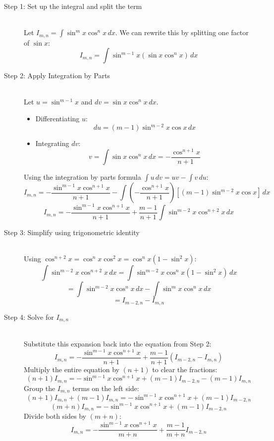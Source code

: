\documentclass[11pt, a4paper]{article}
\begin{document}
\begin{description}
    \item[Step 1: Set up the integral and split the term] \ \\
    Let $I_{m, n} = \int \sin^m x \cos^n x \, dx$.
    We can rewrite this by splitting one factor of $\sin x$:
    \[ I_{m, n} = \int \sin^{m-1} x \left( \sin x \cos^n x \right) \, dx \]

    \item[Step 2: Apply Integration by Parts] \ \\
    Let $u = \sin^{m-1} x$ and $dv = \sin x \cos^n x \, dx$.
    \begin{itemize}
        \item Differentiating $u$:
        \[ du = (m-1) \sin^{m-2} x \cos x \, dx \]
        \item Integrating $dv$:
        \[ v = \int \sin x \cos^n x \, dx = -\frac{\cos^{n+1} x}{n+1} \]
    \end{itemize}
    Using the integration by parts formula $\int u \, dv = uv - \int v \, du$:
    \[ I_{m, n} = -\frac{\sin^{m-1} x \cos^{n+1} x}{n+1} - \int \left( -\frac{\cos^{n+1} x}{n+1} \right) \left[ (m-1) \sin^{m-2} x \cos x \right] \, dx \]
    \[ I_{m, n} = -\frac{\sin^{m-1} x \cos^{n+1} x}{n+1} + \frac{m-1}{n+1} \int \sin^{m-2} x \cos^{n+2} x \, dx \]

    \item[Step 3: Simplify using trigonometric identity] \ \\
    Using $\cos^{n+2} x = \cos^n x \cos^2 x = \cos^n x (1 - \sin^2 x)$:
    \[ \int \sin^{m-2} x \cos^{n+2} x \, dx = \int \sin^{m-2} x \cos^n x (1 - \sin^2 x) \, dx \]
    \[ = \int \sin^{m-2} x \cos^n x \, dx - \int \sin^m x \cos^n x \, dx \]
    \[ = I_{m-2, n} - I_{m, n} \]

    \item[Step 4: Solve for $I_{m, n}$] \ \\
    Substitute this expansion back into the equation from Step 2:
    \[ I_{m, n} = -\frac{\sin^{m-1} x \cos^{n+1} x}{n+1} + \frac{m-1}{n+1} \left( I_{m-2, n} - I_{m, n} \right) \]
    Multiply the entire equation by $(n+1)$ to clear the fractions:
    \[ (n+1) I_{m, n} = -\sin^{m-1} x \cos^{n+1} x + (m-1) I_{m-2, n} - (m-1) I_{m, n} \]
    Group the $I_{m, n}$ terms on the left side:
    \[ (n+1) I_{m, n} + (m-1) I_{m, n} = -\sin^{m-1} x \cos^{n+1} x + (m-1) I_{m-2, n} \]
    \[ (m+n) I_{m, n} = -\sin^{m-1} x \cos^{n+1} x + (m-1) I_{m-2, n} \]
    Divide both sides by $(m+n)$:
    \[ I_{m, n} = -\frac{\sin^{m-1} x \cos^{n+1} x}{m+n} + \frac{m-1}{m+n} I_{m-2, n} \]
\end{description}
\end{document}

